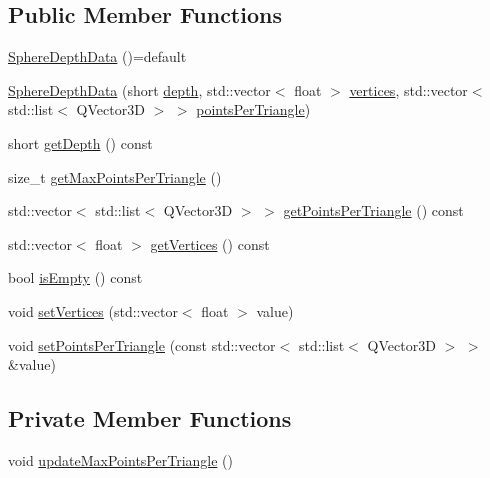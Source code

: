 \subsection*{Public Member Functions}
\begin{DoxyCompactItemize}
\item 
\hyperlink{struct_sphere_depth_data_adf3b418ea38626e3d768240d257504ea}{Sphere\+Depth\+Data} ()=default
\item 
\hyperlink{struct_sphere_depth_data_a746de4be5c4ff2bdcbdc1517aa88a4d9}{Sphere\+Depth\+Data} (short \hyperlink{struct_sphere_depth_data_a32dc63866d12b3102942e14bb28238ff}{depth}, std\+::vector$<$ float $>$ \hyperlink{struct_sphere_depth_data_a139a9131aa15308e012fc8190de2011d}{vertices}, std\+::vector$<$ std\+::list$<$ Q\+Vector3D $>$ $>$ \hyperlink{struct_sphere_depth_data_a9decfacc00300c153ecff80288b7413f}{points\+Per\+Triangle})
\item 
short \hyperlink{struct_sphere_depth_data_a925a7e0a5486b49151d823471ebe7fe6}{get\+Depth} () const
\item 
size\+\_\+t \hyperlink{struct_sphere_depth_data_ad151dd50ed037d91aecec6b285a3e342}{get\+Max\+Points\+Per\+Triangle} ()
\item 
std\+::vector$<$ std\+::list$<$ Q\+Vector3D $>$ $>$ \hyperlink{struct_sphere_depth_data_af42bd1ede7948a735367755a61148adc}{get\+Points\+Per\+Triangle} () const
\item 
std\+::vector$<$ float $>$ \hyperlink{struct_sphere_depth_data_adab658de163c515ec9a41a70300a0af9}{get\+Vertices} () const
\item 
bool \hyperlink{struct_sphere_depth_data_acdda270334d050e23b82ad0f700c5c1c}{is\+Empty} () const
\item 
void \hyperlink{struct_sphere_depth_data_a95e070bea3d8ec4a0449044e4616208f}{set\+Vertices} (std\+::vector$<$ float $>$ value)
\item 
void \hyperlink{struct_sphere_depth_data_ac0d61e109f98ac7c5b7f4ea7381bc963}{set\+Points\+Per\+Triangle} (const std\+::vector$<$ std\+::list$<$ Q\+Vector3D $>$ $>$ \&value)
\end{DoxyCompactItemize}
\subsection*{Private Member Functions}
\begin{DoxyCompactItemize}
\item 
void \hyperlink{struct_sphere_depth_data_a4cf92f63341fd72e6659dcd1501eb2ac}{update\+Max\+Points\+Per\+Triangle} ()
\end{DoxyCompactItemize}
